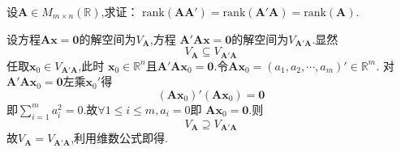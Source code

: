 \begin{brown}
\begin{example}
    设$\bm{A}\in M_{m\times n}\left(\mathbb{R}\right)$,求证：
    $\mathrm{rank}\left(\bm{AA}'\right)=\mathrm{rank}\left(\bm{A}'\bm{A}\right)
    =\mathrm{rank}\left(\bm{A}\right).$
\end{example}
\begin{Proof}
设方程$\bm{Ax}=\bm{0}$的解空间为$V_{\bm{A}}$,方程
$\bm{A}'\bm{Ax}=\bm{0}$的解空间为$V_{\bm{A}'\bm{A}}
$.显然
\newpage
\[
V_{\bm{A}}\subseteq
 V_{\bm{A}'\bm{A}}
 \]
 任取$\bm{x}_0\in V_{\bm{A}'\bm{A}}$,此时
 $\bm{x}_0\in \mathbb{R}^n$且$\bm{A}'\bm{Ax}_0=\bm{0}.
 $令$\bm{Ax}_0=\left(a_1,a_2,\cdots,a_m\right)'\in \mathbb{R}^m$.
 对$\bm{A}'\bm{Ax}_0=\bm{0}$左乘$\bm{x}_0'$得
 \[
\left(\bm{Ax}_0\right)'\left(\bm{Ax}_0\right)
=\bm{0}
 \]
 即$\displaystyle
 \sum_{i=1}^{m}a_i^2=0.$故$\forall 1\leqslant i\leqslant m,a_i=0$即
 $\bm{Ax}_0=\bm{0}.$则
 \[
V_{\bm{A}}\supseteq
 V_{\bm{A}'\bm{A}}
 \]
 故$
V_{\bm{A}}=
 V_{\bm{A}'\bm{A}}
 $,利用维数公式即得.
\end{Proof}
\end{brown}